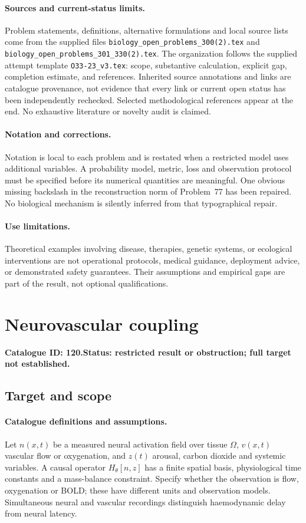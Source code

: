 \documentclass[11pt]{article}
\begin{document}
\paragraph{Sources and current-status limits.}
Problem statements, definitions, alternative formulations and local source lists
come from the supplied files
\texttt{biology\_open\_problems\_300(2).tex} and
\texttt{biology\_open\_problems\_301\_330(2).tex}.
The organization follows the supplied attempt template
\texttt{O33-23\_v3.tex}: scope, substantive calculation, explicit gap,
completion estimate, and references. Inherited source annotations and links are
catalogue provenance, not evidence that every link or current open status has
been independently rechecked. Selected methodological references appear at the
end. No exhaustive literature or novelty audit is claimed.

\paragraph{Notation and corrections.}
Notation is local to each problem and is restated when a restricted model uses
additional variables. A probability model, metric, loss and observation protocol
must be specified before its numerical quantities are meaningful. One obvious
missing backslash in the reconstruction norm of Problem~77 has been repaired.
No biological mechanism is silently inferred from that typographical repair.

\paragraph{Use limitations.}
Theoretical examples involving disease, therapies, genetic systems, or ecological
interventions are not operational protocols, medical guidance, deployment advice,
or demonstrated safety guarantees. Their assumptions and empirical gaps are part
of the result, not optional qualifications.

\setcounter{section}{119}
\section{Neurovascular coupling}
\label{prob:120}
\noindent\textbf{Catalogue ID: 120.}\quad \textbf{Status: restricted result or obstruction; full target not established.}
\subsection{Target and scope}
\paragraph{Catalogue definitions and assumptions.}
Let $n(x,t)$ be a measured neural activation field over tissue $\Omega$, $v(x,t)$ vascular flow or oxygenation, and $z(t)$ arousal, carbon dioxide and systemic variables. A causal operator $H_\theta[n,z]$ has a finite spatial basis, physiological time constants and a mass-balance constraint. Specify whether the observation is flow, oxygenation or BOLD; these have different units and observation models. Simultaneous neural and vascular recordings distinguish haemodynamic delay from neural latency.
\end{document}
